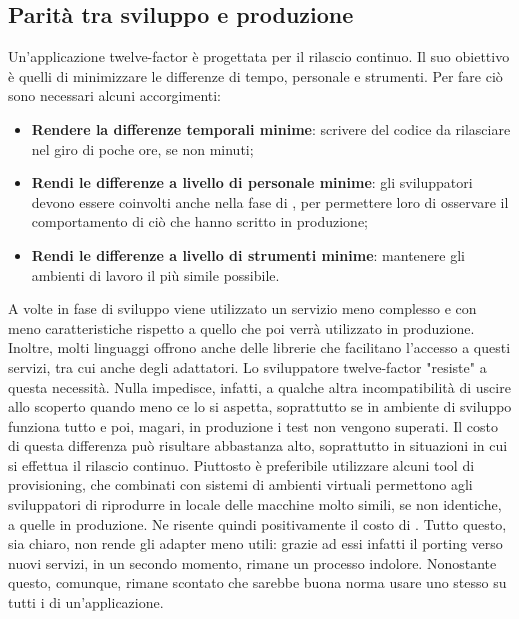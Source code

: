 \documentclass[PianoDiQualifica.tex]{subfiles}
\begin{document}
\subsection{Parità tra sviluppo e produzione}
Un'applicazione twelve-factor è progettata per il rilascio continuo. Il suo obiettivo è quelli di minimizzare le differenze di tempo, personale e strumenti.
Per fare ciò sono necessari alcuni accorgimenti:
\begin{itemize}
\item \textbf{Rendere la differenze temporali minime}: scrivere del codice da rilasciare nel giro di poche ore, se non minuti;
\item \textbf{Rendi le differenze a livello di personale minime}: gli sviluppatori devono essere coinvolti anche nella fase di , per permettere loro di osservare il comportamento di ciò che hanno scritto in produzione;
\item \textbf{Rendi le differenze a livello di strumenti minime}: mantenere gli ambienti di lavoro il più simile possibile.
\end{itemize}
A volte in fase di sviluppo viene utilizzato un servizio meno complesso e con meno caratteristiche rispetto a quello che poi verrà utilizzato in produzione. Inoltre, molti linguaggi offrono anche delle librerie che facilitano l'accesso a questi servizi, tra cui anche degli adattatori. Lo sviluppatore twelve-factor "resiste" a questa necessità. Nulla impedisce, infatti, a qualche altra incompatibilità di uscire allo scoperto quando meno ce lo si aspetta, soprattutto se in ambiente di sviluppo funziona tutto e poi, magari, in produzione i test non vengono superati. Il costo di questa differenza può risultare abbastanza alto, soprattutto in situazioni in cui si effettua il rilascio continuo.
Piuttosto è preferibile utilizzare alcuni tool di provisioning, che combinati con sistemi di ambienti virtuali permettono agli sviluppatori di riprodurre in locale delle macchine molto simili, se non identiche, a quelle in produzione. Ne risente quindi positivamente il costo di .
Tutto questo, sia chiaro, non rende gli adapter meno utili: grazie ad essi infatti il porting verso nuovi servizi, in un secondo momento, rimane un processo indolore. Nonostante questo, comunque, rimane scontato che sarebbe buona norma usare uno stesso  su tutti i  di un'applicazione.
\end{document}
